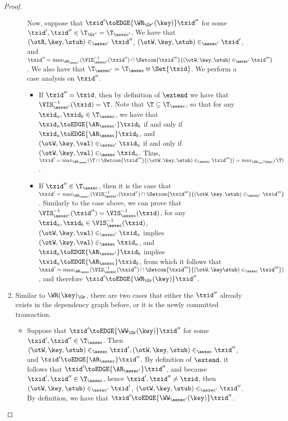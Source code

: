 \begin{proof}
\begin{enumerate}
\begin{itemize}
Now, suppose that $\txid' \toEDGE{\WR_{\Gr'}(\key)} \txid''$ for some $\txid', \txid'' \in \T_{\Gr'} = 
\T_{\aexec'}$. We have that $ (\otR, \key, \stub) \in_{\aexec'} \txid''$, 
$(\otW, \key, \stub) \in_{\aexec'} \txid'$, and $\txid'' = \max_{\AR_{\aexec'}}(\VIS_{\aexec'}^{-1}(\txid'') 
\cap \Setcon{ \txid''' }{ (\otW, \key, \stub) \in_{\aexec'} \txid'''}$. 
We also have that $\T_{\aexec'} = \T_{\aexec} \uplus \Set{\txid}$. We perform a case 
analysis on $\txid''$. 

\begin{itemize}
\item If $\txid'' = \txid$, then by definition of $\extend$ we have that 
$\VIS^{-1}_{\aexec'}(\txid) = \T$. Note that $\T \subseteq \T_{\aexec}$, so that 
for any $\txid_{a}, \txid_{b} \in \T_{\aexec}$, we have that $\txid_{a} \toEDGE{\AR_{\aexec'}} \txid_{b}$ 
if and only if $\txid_{a} \toEDGE{\AR_{\aexec}} \txid_{b}$, 
and $(\otW, \key, \val) \in_{\aexec'} \txid_{a}$ if and only if $(\otW, \key, \val) \in_{\aexec} \txid_{a}$. 
Thus, $\txid' = \max_{\AR_{\aexec}}(\T 
\cap \Setcon{\txid''' }{ (\otW, \key, \stub) \in_{\aexec} \txid'''}) = \max_{\WW_{\Gr}(\key)}(\T)$. 

\item If $\txid'' \in \T_{\aexec}$, then it is the case that 
    $\txid' = \max_{\AR_{\aexec'}}(\VIS^{-1}_{\aexec'}(\txid'') \cap \Setcon{ \txid''' }{ (\otW, \key, \stub) \in_{\aexec'} \txid'''}$. 
Similarly to the case above, we can prove that $\VIS^{-1}_{\aexec'}(\txid'') = \VIS^{-1}_{\aexec}(\txid)$, 
for any $\txid_{a}, \txid_{b} \in \VIS^{-1}_{\aexec}(\txid)$, $(\otW, \key, \val) \in_{\aexec'} \txid_{a}$ 
implies $(\otW, \key, \val) \in_{\aexec} \txid_{a}$, and $\txid_{a} \toEDGE{\AR_{\aexec'}} \txid_{b}$ 
implies $\txid_{a} \toEDGE{\AR_{\aexec}} \txid_{b}$, from which it follows that 
$\txid' = \max_{\AR_{\aexec}}(\VIS^{-1}_{\aexec}(\txid'') \cap \Setcon{ \txid''' }{ (\otW, \key \stub) \in_{\aexec} \txid'''})$, 
and therefore $\txid' \toEDGE{\WR_{\Gr}(\key)} \txid''$.
\end{itemize}
\end{itemize}

\item 
Similar to \( \WR(\key)_{\Gr} \), there are two cases that either the \( \txid'' \) already exists in the dependency graph before,
or it is the newly committed transaction.
\begin{itemize}
\item Suppose that $\txid' \toEDGE{\WW_{\Gr}(\key)} \txid''$ for some $\txid', \txid'' \in \T_{\aexec}$. 
Then $(\otW,\key,\stub) \in_{\aexec} \txid', (\otW, \key, \stub) \in_{\aexec} \txid''$, and $\txid' \toEDGE{\AR_{\aexec}} \txid''$. 
By definition of $\extend$, it follows that $\txid' \toEDGE{\AR_{\aexec'}} \txid''$, and because 
$\txid', \txid'' \in \T_{\aexec}$, hence $\txid', \txid'' \neq \txid$, then 
$(\otW,\key, \stub) \in_{\aexec'} \txid'$, $(\otW, \key, \stub) \in_{\aexec'} \txid''$. By definition, 
we have that $\txid' \toEDGE{\WW_{\aexec'}(\key)} \txid''$.


\end{itemize}
\end{enumerate}
\end{proof}
